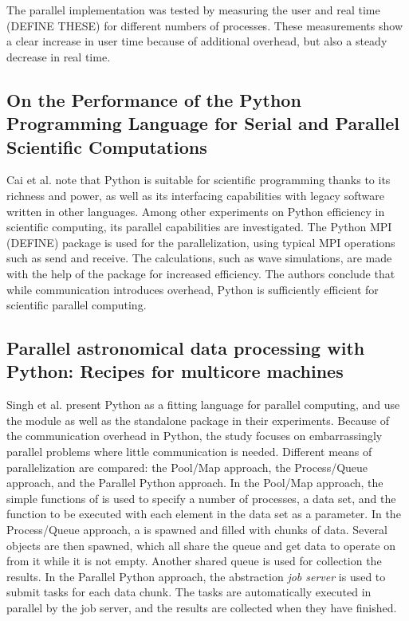 The parallel implementation was tested by measuring the user and real time (DEFINE THESE) for different numbers of processes.
These measurements show a clear increase in user time because of additional overhead, but also a steady decrease in real time.

\subsection{On the Performance of the Python Programming Language for Serial and Parallel Scientific Computations}
Cai et al. \cite{cai_2005_performance_otpotpplfsapsc} note that Python is suitable for scientific programming thanks to its richness and
power, as well as its interfacing capabilities with legacy software written in other languages. Among other experiments on Python
efficiency in scientific computing, its parallel capabilities are investigated. The Python MPI (DEFINE) package  is used for
the parallelization, using typical MPI operations such as send and receive. The calculations, such as wave simulations, 
are made with the help of the  package for increased efficiency. The authors conclude that while communication 
introduces overhead, Python is sufficiently efficient for scientific parallel computing.

\subsection{Parallel astronomical data processing with Python: Recipes for multicore machines}
Singh et al. \cite{singh_2013_parallel_padpwprfmm} present Python as a fitting language for parallel computing, and use the
 module as well as the standalone  package in their experiments. Because of the
communication overhead in Python, the study focuses on embarrassingly parallel problems where little communication is needed.
Different means of parallelization are
compared: the Pool/Map approach, the Process/Queue approach, and the Parallel Python approach. %
In the Pool/Map approach, the simple functions of  is used to specify a number of processes, a data
set, and the function to be executed with each element in the data set as a parameter. In the Process/Queue approach, a
 is spawned and filled with chunks of data. Several  objects are then
spawned, which all share the queue and get data to operate on from it while it is not empty. Another shared queue is used for
collection the results. In the Parallel Python approach, the  abstraction \emph{job server}
is used to submit tasks for each data chunk. The tasks are automatically executed in parallel by the job server, and the results
are collected when they have finished.

